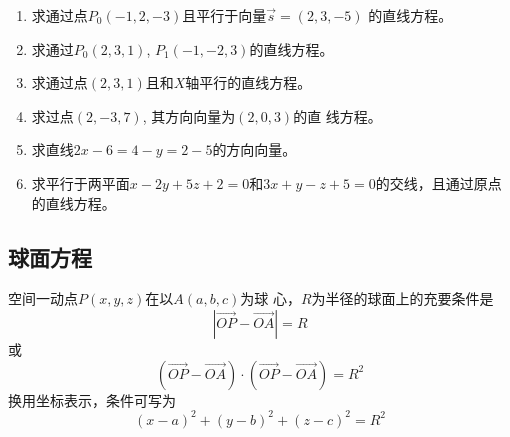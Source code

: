













































\begin{ex}
\begin{enumerate}
    \item 求通过点$P_0(-1,2,-3)$且平行于向量$\vec{s}=(2,3,-5)$
    的直线方程。
    \item 求通过$P_0(2,3,1)$, $P_1(-1,-2,3)$的直线方程。
    \item 求通过点$(2,3,1)$且和$X$轴平行的直线方程。
    \item 求过点$(2,-3,7)$, 其方向向量为$(2,0,3)$的直
    线方程。
    \item 求直线$2x-6=4-y=2-5$的方向向量。
    \item 求平行于两平面$x-2y+5z+2=0$和$3x+y-z
    +5=0$的交线，且通过原点的直线方程。
\end{enumerate}
\end{ex}


\subsection{球面方程}
空间一动点$P(x,y,z)$在以$A(a,b,c)$为球
心，$R$为半径的球面上的充要条件是
\[|\Vec{OP}-\Vec{OA}|=R\]
或
\[(\Vec{OP}-\Vec{OA})\cdot (\Vec{OP}-\Vec{OA})=R^2\]
换用坐标表示，条件可写为
\begin{equation}
    (x-a)^2+(y-b)^2+(z-c)^2=R^2
\end{equation}

\begin{figure}[htp]
    \centering
{}
    \caption{}
\end{figure}



